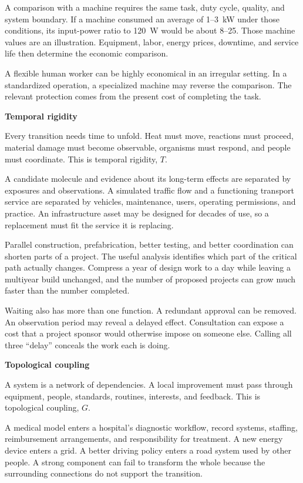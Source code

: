 \documentclass[11pt,openany]{book}
\newcommand{\subhead}[1]{\par\medskip\noindent\textbf{#1}\par\nobreak\smallskip}
\begin{document}
A comparison with a machine requires the same task, duty cycle, quality, and system boundary. If a machine consumed an average of 1--3~kW under those conditions, its input-power ratio to 120~W would be about 8--25. Those machine values are an illustration. Equipment, labor, energy prices, downtime, and service life then determine the economic comparison.

A flexible human worker can be highly economical in an irregular setting. In a standardized operation, a specialized machine may reverse the comparison. The relevant protection comes from the present cost of completing the task.

\subhead{Temporal rigidity}

Every transition needs time to unfold. Heat must move, reactions must proceed, material damage must become observable, organisms must respond, and people must coordinate. This is temporal rigidity, $T$.

A candidate molecule and evidence about its long-term effects are separated by exposures and observations. A simulated traffic flow and a functioning transport service are separated by vehicles, maintenance, users, operating permissions, and practice. An infrastructure asset may be designed for decades of use, so a replacement must fit the service it is replacing.\cite{miatto2017how}

Parallel construction, prefabrication, better testing, and better coordination can shorten parts of a project. The useful analysis identifies which part of the critical path actually changes. Compress a year of design work to a day while leaving a multiyear build unchanged, and the number of proposed projects can grow much faster than the number completed.

Waiting also has more than one function. A redundant approval can be removed. An observation period may reveal a delayed effect. Consultation can expose a cost that a project sponsor would otherwise impose on someone else. Calling all three “delay” conceals the work each is doing.

\subhead{Topological coupling}

A system is a network of dependencies. A local improvement must pass through equipment, people, standards, routines, interests, and feedback. This is topological coupling, $G$.

A medical model enters a hospital's diagnostic workflow, record systems, staffing, reimbursement arrangements, and responsibility for treatment. A new energy device enters a grid. A better driving policy enters a road system used by other people. A strong component can fail to transform the whole because the surrounding connections do not support the transition.
\end{document}
